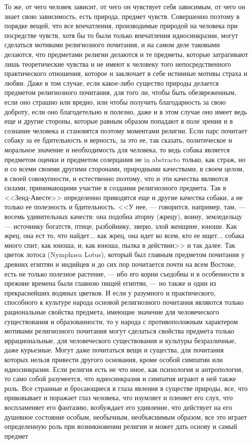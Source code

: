 \documentclass[12pt]{article}
\begin{document}
То же, от чего человек зависит, от чего он чувствует себя зависимым, от чего он знает свою зависимость, есть природа, предмет чувств. Совершенно поэтому в порядке вещей, что все впечатления, производимые природой на человека при посредстве чувств, хотя бы то были только впечатления идиосинкразии, могут сделаться мотивами религиозного почитания, и на самом деле таковыми делаются, что предметами религии делаются и те предметы, которые затрагивают лишь теоретические чувства и не имеют к человеку того непосредственного практического отношения, которое и заключает в себе истинные мотивы страха и любви. Даже в том случае, если какое-либо существо природы делается предметом религиозного почитания, для того ли, чтобы быть обезвреженным, если оно страшно или вредно, или чтобы получить благодарность за свою доброту, если оно благодетельно и полезно, даже и в этом случае оно имеет ведь еще и другие стороны, которые равным образом попадают в поле зрения и в сознание человека и становятся поэтому моментами религии. Если парс почитает собаку за ее бдительность и верность, за это ее, так сказать, политическое и моральное значение и необходимость для человека, то ведь собака является предметом оценки и предметом созерцания не in abstracto только, как страж, но и со всеми своими другими сторонами, природными качествами, в своем целом, в своей совокупности, и естественно поэтому, что и эти качества являются силами, принимающими участие в создании религиозного предмета. Так в <<Зенд-Авесте>> определенно приводятся еще и другие качества собаки, а не только ее полезность и бдительность. <<У нее, --- говорится, например, там, --- восемь удивительных качеств: она подобна аторну (жрецу), воину, земледельцу --- источнику богатств, птице, разбойнику, зверю, злой женщине, юноше. Как жрец, она ест то, что найдет... как жрец, она идет ко всем, кто ее ищет... собака много спит, как юноша, и, как юноша, пылка в действии>> и так далее. Так цветок лотоса (Nymphaea Lotus), который был главным предметом почитания у древних египтян и индийцев и до сих пор почитается почти на всем Востоке, есть не только полезное растение, --- ибо его корни съедобны и в особенности в прежние времена были главною пищей египтян, --- но также и один из прекраснейших водяных цветков. И если у разумного и практического, способного к культуре народа основой религиозного почитания являются только рациональные свойства предмета, имеющие значение для человеческого существования и образованности, то у народа с противоположным характером мотивами религиозного почитания могут сделаться свойства предмета только иррациональные, для человеческого существования и культуры безразличные, даже курьезные. Могут даже почитаться вещи и существа, для почитания которых нельзя привести другого основания, кроме особой симпатии или идиосинкразии. Если религия есть не что иное, как психология и антропология, то само собой разумеется, что идиосинкразия и симпатия играют в ней также роль. Все странные и бросающиеся в глаза явления в существе природы, все, что приковывает и поражает глаз человека, что изумляет и пленяет его слух, что воспламеняет его фантазию, возбуждает его удивление, что действует на его душевное состояние особым, необычным, необъяснимым образом, все это играет определенную роль при возникновении религии и может дать основу и самый предмет 
\end{document}
